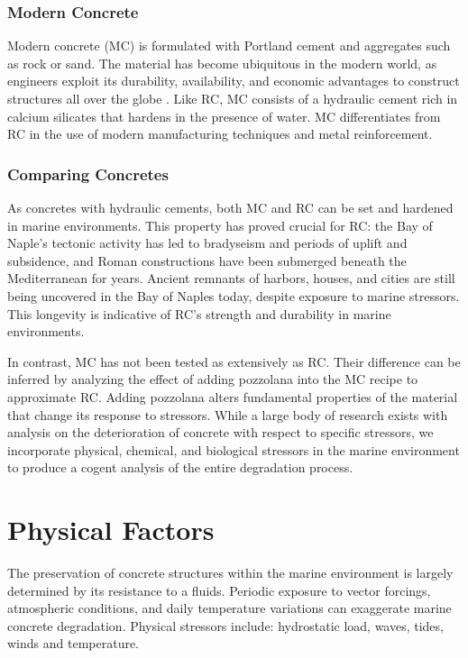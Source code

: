 \documentclass[12pt]{article}
\begin{document}
\subsubsection*{Modern Concrete}
    
Modern concrete (MC) is formulated with Portland cement and aggregates such as rock or sand. The material has become ubiquitous in the modern world, as engineers exploit its durability, availability, and economic advantages to construct structures all over the globe
. Like RC, MC consists of a hydraulic cement rich in calcium silicates that hardens in the presence of water. MC differentiates from RC in the use of modern manufacturing techniques and metal reinforcement. 

\subsubsection*{Comparing Concretes}

As concretes with hydraulic cements, both MC and RC can be set and hardened in marine environments. This property has proved crucial for RC: the Bay of Naple's tectonic activity has led to bradyseism and periods of uplift and subsidence, and Roman constructions have been submerged beneath the Mediterranean for years. Ancient remnants of harbors, houses, and cities are still being uncovered in the Bay of Naples today, despite exposure to marine stressors. This longevity is indicative of RC's strength and durability in marine environments.

In contrast, MC has not been tested as extensively as RC. Their difference can be inferred by analyzing the effect of adding pozzolana into the MC recipe to approximate RC. Adding pozzolana alters fundamental properties of the material that change its response to stressors. While a large body of research exists with analysis on the deterioration of concrete with respect to specific stressors, we incorporate physical, chemical, and biological stressors in the marine environment to produce a cogent analysis of the entire degradation process.

\section*{Physical Factors}

The preservation of concrete structures within the marine environment is largely determined by its resistance to a fluids. Periodic exposure to vector forcings, atmospheric conditions, and daily temperature variations can exaggerate marine concrete degradation. Physical stressors include: hydrostatic load, waves, tides, winds and temperature.
\end{document}
